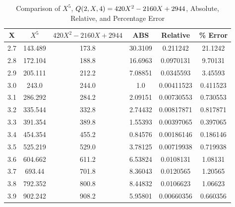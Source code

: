 ﻿\begin{table}[h!]
    \centering
    \caption{Comparison of $X^5$, ${Q}(2,X,4) = 420X^2 - 2160X + 2944$, Absolute, Relative, and Percentage Error}
    \begin{tabular}{|c|c|c|c|c|c|}
        \hline
        \textbf{X} & \textbf{$X^5$} & \textbf{$420X^2-2160X+2944$} & \textbf{ABS} & \textbf{Relative} & \textbf{\% Error} \\ \hline
        2.7        & 143.489        & 173.8                        & 30.3109      & 0.211242          & 21.1242           \\ \hline
        2.8        & 172.104        & 188.8                        & 16.6963      & 0.0970131         & 9.70131           \\ \hline
        2.9        & 205.111        & 212.2                        & 7.08851      & 0.0345593         & 3.45593           \\ \hline
        3.0        & 243.0          & 244.0                        & 1.0          & 0.00411523        & 0.411523          \\ \hline
        3.1        & 286.292        & 284.2                        & 2.09151      & 0.00730553        & 0.730553          \\ \hline
        3.2        & 335.544        & 332.8                        & 2.74432      & 0.00817871        & 0.817871          \\ \hline
        3.3        & 391.354        & 389.8                        & 1.55393      & 0.00397065        & 0.397065          \\ \hline
        3.4        & 454.354        & 455.2                        & 0.84576      & 0.00186146        & 0.186146          \\ \hline
        3.5        & 525.219        & 529.0                        & 3.78125      & 0.00719938        & 0.719938          \\ \hline
        3.6        & 604.662        & 611.2                        & 6.53824      & 0.0108131         & 1.08131           \\ \hline
        3.7        & 693.44         & 701.8                        & 8.36043      & 0.0120565         & 1.20565           \\ \hline
        3.8        & 792.352        & 800.8                        & 8.44832      & 0.0106623         & 1.06623           \\ \hline
        3.9        & 902.242        & 908.2                        & 5.95801      & 0.00660356        & 0.660356          \\ \hline

\end{tabular}
\end{table}
